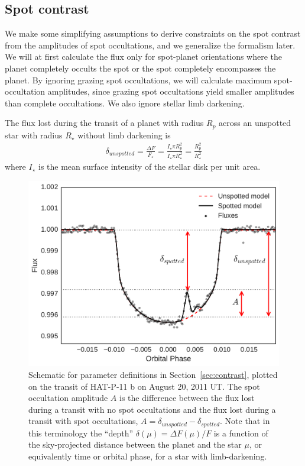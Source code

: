 \begin{subappendices}
\section*{Spot contrast} \label{sec:appendix_contrast}

We make some simplifying assumptions to derive constraints on the spot contrast from the amplitudes of spot occultations, and we generalize the formalism later. We will at first calculate the flux only for spot-planet orientations where the planet completely occults the spot or the spot completely encompasses the planet. By ignoring grazing spot occultations, we will calculate maximum spot-occultation amplitudes, since grazing spot occultations yield smaller amplitudes than complete occultations. We also ignore stellar limb darkening.

The flux lost during the transit of a planet with radius $R_p$ across an unspotted star with radius $R_\star$ without limb darkening is
\begin{eqnarray}
\delta_{unspotted} = \frac{\Delta F}{F_\star} = \frac{I_\star \pi R_p^2}{I_\star \pi R_\star^2} = \frac{R_p^2}{R_\star^2}
\end{eqnarray}
where $I_\star$ is the mean surface intensity of the stellar disk per unit area. 
\begin{figure}
\centering
\includegraphics[scale=0.4]{stsp_hat_p_11/contrast_schematic.pdf}
\caption{Schematic for parameter definitions in Section~\ref{sec:contrast}, plotted on the transit of HAT-P-11 b on August 20, 2011 UT. The spot occultation amplitude $A$ is the difference between the flux lost during a transit with no spot occultations and the flux lost during a transit with spot occultations, $A = \delta_{unspotted} - \delta_{spotted}$. Note that in this terminology the ``depth'' $\delta(\mu) = \Delta F(\mu)/F$ is a function of the sky-projected distance between the planet and the star $\mu$, or equivalently time or orbital phase, for a star with limb-darkening.}
\label{fig:contrast_schematic}
\end{figure}


\end{subappendices}

